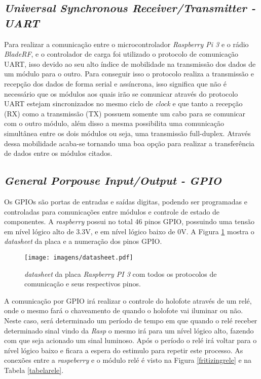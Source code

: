 \subsection{\emph{Universal Synchronous Receiver/Transmitter - UART}}
    Para realizar a comunicação entre o microcontrolador \emph{Raspberry Pi 3} e o rádio \emph{BladeRF}, e o controlador de carga foi utilizado o protocolo de comunicação UART, isso devido ao seu alto índice de mobilidade na transmissão dos dados de um módulo para o outro. Para conseguir isso o protocolo realiza a transmissão e recepção dos dados de forma serial e assíncrona, isso significa que não é necessário que os módulos aos quais irão se comunicar através do protocolo UART estejam sincronizados no mesmo ciclo de \emph{clock} e que tanto a recepção (RX) como a transmissão (TX) possuem somente um cabo para se comunicar com o outro módulo, além disso a mesma possibilita uma comunicação simultânea entre os dois módulos ou seja, uma transmissão full-duplex. Através dessa mobilidade acaba-se tornando uma boa opção para realizar a transferência de dados entre os módulos citados.
    
    


\subsection{\emph{General Porpouse Input/Output - GPIO}}

Os GPIOs são portas de entradas e saídas digitas, podendo ser programadas e controladas para comunicações entre módulos e controle de estado de componentes. A \emph{raspberry} possui no total 46 pinos GPIO, possuindo uma tensão em nível lógico alto de 3.3V, e em nível lógico baixo de 0V. A Figura \ref{datasheet} mostra o \emph{datasheet} da placa e a numeração dos pinos GPIO.

\begin{figure}[H]
    \centering
    \texttt{[image: imagens/datasheet.pdf]}
    \caption{\emph{datasheet} da placa \emph{Raspberry PI 3} com todos os protocolos de comunicação e seus respectivos pinos.}
    \label{datasheet}
\end{figure}


A comunicação por GPIO irá realizar o controle do holofote através de um relé, onde o mesmo fará o chaveamento de quando o holofote vai iluminar ou não. Neste caso, será determinado um período de tempo em que quando o relé receber determinado sinal vindo da \emph{Rasp} o mesmo irá para um nível lógico alto, fazendo com que seja acionado um sinal luminoso. Após o período o relé irá voltar para o nível lógico baixo e ficara a espera do estimulo para repetir este processo.  As conexões entre a \emph{raspeberry} e o módulo relé é visto na Figura \ref{fritizingrele} e na Tabela \ref{tabelarele}.

